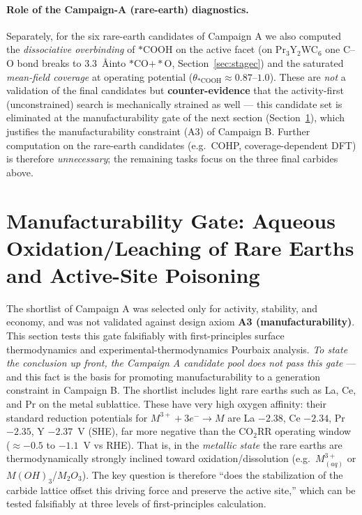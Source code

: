 \documentclass[11pt,a4paper]{report}
\begin{document}
\paragraph{Role of the Campaign-A (rare-earth) diagnostics.} Separately, for the six rare-earth candidates of Campaign A we also computed the
\emph{dissociative overbinding} of $*$COOH on the active facet (on Pr$_3$Y$_2$WC$_6$ one C--O bond breaks to 3.3~\AA into $*$CO$+*$O,
Section~\ref{sec:stagec}) and the saturated \emph{mean-field coverage} at operating potential ($\theta_{*\mathrm{COOH}}\!\approx\!0.87$--$1.0$).
These are \emph{not} a validation of the final candidates but \textbf{counter-evidence} that the activity-first (unconstrained) search is
mechanically strained as well --- this candidate set is eliminated at the manufacturability gate of the next section
(Section~\ref{sec:ree-stability}), which justifies the manufacturability constraint (A3) of Campaign B. Further computation on the rare-earth
candidates (e.g.\ COHP, coverage-dependent DFT) is therefore \emph{unnecessary}; the remaining tasks focus on the three final carbides above.

\section{Manufacturability Gate: Aqueous Oxidation/Leaching of Rare Earths and Active-Site Poisoning}
\label{sec:ree-stability}
The shortlist of Campaign A was selected only for activity, stability, and economy, and was not validated against design axiom
\textbf{A3 (manufacturability)}. This section tests this gate falsifiably with first-principles surface thermodynamics and experimental-thermodynamics Pourbaix analysis. \emph{To state the conclusion up front, the Campaign A candidate pool does not pass this gate} --- and this fact is
the basis for promoting manufacturability to a generation constraint in Campaign B. The shortlist includes light rare earths such as La, Ce, and Pr on the
metal sublattice. These have very high oxygen affinity: their standard reduction potentials for $M^{3+}\!+\!3e^-\!\to\!M$ are La $-2.38$,
Ce $-2.34$, Pr $-2.35$, Y $-2.37$~V (SHE), far more negative than the CO$_2$RR operating window ($\approx -0.5$ to $-1.1$~V vs RHE). That is,
in the \emph{metallic state} the rare earths are thermodynamically strongly inclined toward oxidation/dissolution (e.g.\ $M^{3+}_{(aq)}$ or
$M(OH)_3$/$M_2O_3$). The key question is therefore ``does the stabilization of the carbide lattice offset this driving force and preserve the active site,''
which can be tested falsifiably at three levels of first-principles calculation.
\end{document}
